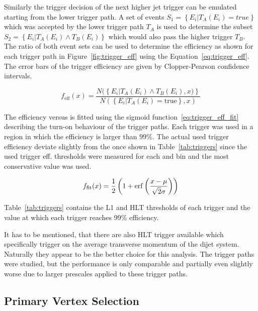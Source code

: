 Similarly the trigger decision of the next higher jet trigger can be emulated
starting from the lower trigger path. A set of events $S_1 = \left\{E_i | T_A
(E_i) = true \right\}$ which was accepted  by the lower trigger path $T_A$ is
used to determine the subset $S_2 = \left\{E_i|T_A(E_i) \wedge  T_B(E_i)
\right\}$ which would also pass the higher trigger $T_B$. The ratio of both
event sets can be used to determine the efficiency as shown for each trigger
path in Figure~\ref{fig:trigger_eff} using the Equation~\ref{eq:trigger_eff}.
The error bars of the trigger efficiency are given by Clopper-Pearson confidence
intervals.

\begin{equation}
\label{eq:trigger_eff}
    f_{\mathrm{eff}} (x) = \frac{N(\left\{E_i|T_A(E_i) \wedge T_B(E_i), x)\right\}}{N(\left\{ E_i | T_A(E_i) = \mathrm{true} \right\} , x)}
\end{equation}

The efficiency versus \ptavg is fitted using the sigmoid function~\ref{eq:trigger_eff_fit} describing
the turn-on behaviour of the trigger paths. Each trigger was used in a region in which the efficiency
is larger than $99\%$. The actual used trigger efficiency deviate slightly from the once shown in Table~\ref{tab:triggers}
since the used trigger eff. thresholds were measured for each \ystar and \yboost bin and the most
conservative value was used.

\begin{equation}
\label{eq:trigger_eff_fit}
    f_{\mathrm{fit}} (x) = \frac{1}{2} \left( 1 + \operatorname{erf} \left(\frac{x-\mu}{\sqrt{2}\sigma}\right)\right)
\end{equation}

Table~\ref{tab:triggers} contains the L1 and HLT thresholds of each trigger and
the \ptavg value at which each trigger reaches 99\% efficiency.

It has to be mentioned, that there are also HLT trigger available which
specifically trigger on the average transverse momentum of the dijet system.
Naturally they appear to be the better choice for this analysis. The \ptavg
trigger paths were studied, but the performance is only comparable and partially
even slightly worse due to larger prescales applied to these trigger paths.

\subsection{Primary Vertex Selection}

